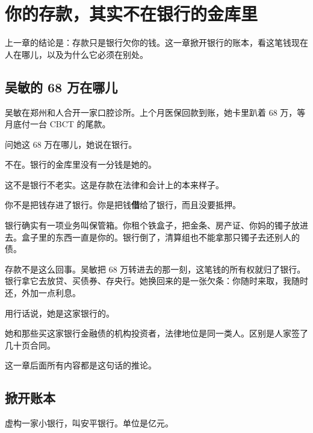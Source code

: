 \chapter{你的存款，其实不在银行的金库里}

\begin{ledetext}
上一章的结论是：存款只是银行欠你的钱。这一章掀开银行的账本，看这笔钱现在人在哪儿，以及为什么它必须在别处。
\end{ledetext}

\section{吴敏的 68 万在哪儿}

吴敏在郑州和人合开一家口腔诊所。上个月医保回款到账，她卡里趴着 68 万，等月底付一台 CBCT 的尾款。

问她这 68 万在哪儿，她说在银行。

不在。银行的金库里没有一分钱是她的。

这不是银行不老实。这是存款在法律和会计上的本来样子。

\begin{pullquote}{}
你不是把钱存进了银行。你是把钱\textbf{借}给了银行，而且没要抵押。
\end{pullquote}

银行确实有一项业务叫保管箱。你租个铁盒子，把金条、房产证、你妈的镯子放进去。盒子里的东西一直是你的。银行倒了，清算组也不能拿那只镯子去还别人的债。

存款不是这么回事。吴敏把 68 万转进去的那一刻，这笔钱的所有权就归了银行。银行拿它去放贷、买债券、存央行。她换回来的是一张欠条：你随时来取，我随时还，外加一点利息。

用行话说，她是这家银行的。

她和那些买这家银行金融债的机构投资者，法律地位是同一类人。区别是人家签了几十页合同。

这一章后面所有内容都是这句话的推论。

\section{掀开账本}

虚构一家小银行，叫安平银行。单位是亿元。

\begin{bsheet}
\end{bsheet}

